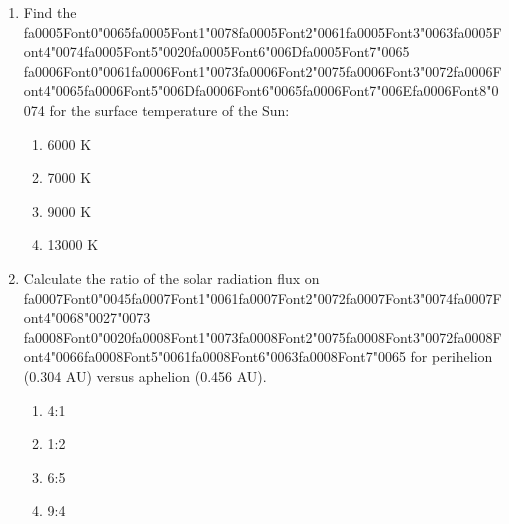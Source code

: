 \documentclass[12pt]{article}
\begin{document}
\begin{enumerate}[label=\arabic*.]
\begin{enumerate}[label=(\alph*)]
    \item Mars Science Laboratory
    \item Phoenix Mars Lander
\end{enumerate}
\item Find the {\csname fa0005Font0\endcsname\char"0065}{\csname fa0005Font1\endcsname\char"0078}{\csname fa0005Font2\endcsname\char"0061}{\csname fa0005Font3\endcsname\char"0063}{\csname fa0005Font4\endcsname\char"0074}{\csname fa0005Font5\endcsname\char"0020}{\csname fa0005Font6\endcsname\char"006D}{\csname fa0005Font7\endcsname\char"0065} {\csname fa0006Font0\endcsname\char"0061}{\csname fa0006Font1\endcsname\char"0073}{\csname fa0006Font2\endcsname\char"0075}{\csname fa0006Font3\endcsname\char"0072}{\csname fa0006Font4\endcsname\char"0065}{\csname fa0006Font5\endcsname\char"006D}{\csname fa0006Font6\endcsname\char"0065}{\csname fa0006Font7\endcsname\char"006E}{\csname fa0006Font8\endcsname\char"0074} for the surface temperature of the Sun:
\begin{enumerate}[label=(\alph*)]
    \item 6000 K
    \item 7000 K
    \item 9000 K
    \item 13000 K
\end{enumerate}
\item Calculate the ratio of the solar radiation flux on {\csname fa0007Font0\endcsname\char"0045}{\csname fa0007Font1\endcsname\char"0061}{\csname fa0007Font2\endcsname\char"0072}{\csname fa0007Font3\endcsname\char"0074}{\csname fa0007Font4\endcsname\char"0068}{\char"0027}{\char"0073} {\csname fa0008Font0\endcsname\char"0020}{\csname fa0008Font1\endcsname\char"0073}{\csname fa0008Font2\endcsname\char"0075}{\csname fa0008Font3\endcsname\char"0072}{\csname fa0008Font4\endcsname\char"0066}{\csname fa0008Font5\endcsname\char"0061}{\csname fa0008Font6\endcsname\char"0063}{\csname fa0008Font7\endcsname\char"0065} for perihelion (0.304
AU) versus aphelion (0.456 AU).
\begin{enumerate}[label=(\alph*)]
    \item 4:1
    \item 1:2
    \item 6:5
    \item 9:4
\end{enumerate}

\end{enumerate}
\end{document}
